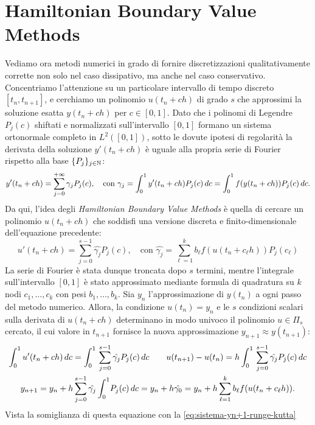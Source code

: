 \section{Hamiltonian Boundary Value Methods}

Vediamo ora metodi numerici in grado di fornire discretizzazioni qualitativamente
corrette non solo nel caso dissipativo, ma anche nel caso conservativo.
Concentriamo l'attenzione su un particolare intervallo di tempo discreto
$[t_n,t_{n+1}]$, e cerchiamo un polinomio $u(t_n+ch)$ di grado $s$ che
approssimi la soluzione esatta $y(t_n+ch)$ per $c \in [0,1]$.
Dato che i polinomi di Legendre $P_j(c)$ shiftati e normalizzati
sull'intervallo $[0,1]$ formano un sistema ortonormale completo in $L^2([0,1])$,
sotto le dovute ipotesi di regolarità la derivata della soluzione $y'(t_n+ch)$
è uguale alla propria serie di Fourier rispetto alla base $\{P_j\}_{j \in \mathbb{N}}$:
\[
y'(t_n+ch) = \sum_{j=0}^{+\infty} \gamma_j P_j(c), \quad
\text{con } \gamma_j = \int_0^1 y'(t_n+ch) P_j(c) \, dc
= \int_0^1 f(y(t_n+ch)) P_j(c) \, dc.
\]
Da qui, l'idea degli \emph{Hamiltonian Boundary Value Methods} è quella di
cercare un polinomio $u(t_n+ch)$ che soddisfi una versione discreta e
finito-dimensionale dell'equazione precedente:
\begin{equation} \label{eq:discretizzazione-serie-di-fourier}
u'(t_n+ch) = \sum_{j=0}^{s-1} \hat{\gamma_j} P_j(c), \quad
\text{con } \hat{\gamma_j} = \sum_{\ell=1}^k b_\ell f(u(t_n + c_\ell h)) P_j(c_\ell)
\end{equation}
La serie di Fourier è stata dunque troncata dopo $s$ termini, mentre l'integrale
sull'intervallo $[0,1]$ è stato approssimato mediante formula di quadratura
su $k$ nodi $c_1,\dots,c_k$ con pesi $b_1,\dots,b_k$.
Sia $y_n$ l'approssimazione di $y(t_n)$ a ogni passo del metodo numerico.
Allora, la condizione $u(t_n) = y_n$ e le $s$ condizioni scalari sulla derivata
di $u(t_n+ch)$ determinano in modo univoco il polinomio $u \in \Pi_s$ cercato,
il cui valore in $t_{n+1}$ fornisce la nuova approssimazione $y_{n+1} \approx y(t_{n+1})$:
\begin{gather*}
\int_0^1 u'(t_n+ch) \, dc
= \int_0^1 \, \sum_{j=0}^{s-1} \hat{\gamma_j} P_j(c) \, dc
\qquad u(t_{n+1}) - u(t_n)
= h \int_0^1 \, \sum_{j=0}^{s-1} \hat{\gamma_j} P_j(c) \, dc \\
y_{n+1}
= y_n + h \sum_{j=0}^{s-1} \hat{\gamma_j} \int_0^1 \! P_j(c) \, dc
= y_n + h \hat{\gamma_0}
= y_n + h \sum_{\ell=1}^k b_\ell f(u(t_n+c_\ell h)).
\end{gather*}
Vista la somiglianza di questa equazione con la \eqref{eq:sistema-yn+1-runge-kutta}

